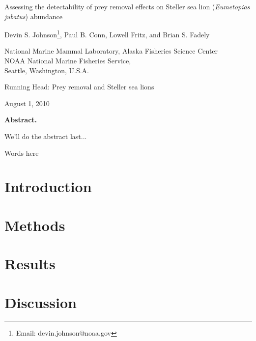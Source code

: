 \documentclass[12pt]{article}
\begin{document}
\renewcommand{\baselinestretch}{1.8}\normalsize

\begin{center}
{\LARGE Assessing the detectability of prey removal effects on Steller sea lion ({\it Eumetopias jubatus}) abundance}\vspace{0.5in}

{\large Devin S. Johnson\footnote[1]{Email: devin.johnson@noaa.gov}, Paul B. Conn, Lowell Fritz, and Brian S. Fadely}

\hrulefill

\renewcommand{\baselinestretch}{1.25}\large
National Marine Mammal Laboratory, Alaska Fisheries Science Center\\
NOAA National Marine Fisheries Service,\\
Seattle, Washington, U.S.A.\\
\hrulefill

\normalsize
{\sc Running Head}: Prey removal and Steller sea lions \bigskip

August 1, 2010
\end{center}


\clearpage

\linenumbers


\centerline{\bf Abstract.} 

We'll do the abstract last...

\noindent \hrulefill

 Words here

\clearpage

\renewcommand{\baselinestretch}{1.8}\normalsize




\section{Introduction}

\nocite{*}


\section{Methods}

\section{Results}

\section{Discussion}




\end{document}
